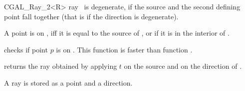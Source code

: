 \begin {classtemplate} {CGAL_Ray_2<R>}
       {ray \var\ is degenerate, if the source and the second defining
        point fall together (that is if the direction is degenerate).}

       {}

       {}

       {A point is on \var, iff it is equal to the source
        of \var, or if it is in the interior of \var.}

       {checks if point $p$ is on \var. This function is faster
        than function .
        }

       {returns the ray obtained by applying $t$ on the source
        and on the direction of \var.}

\implementation

A ray is stored as a point and a direction.


\end {classtemplate} 

%
%
